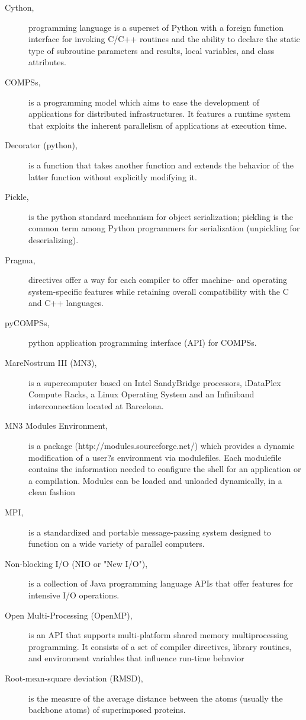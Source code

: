 \begin{description}
\item [Cython,] programming language is a superset of Python with a foreign function interface for invoking C/C++ routines and the ability to declare the static type of subroutine parameters and results, local variables, and class attributes.
\item [COMPSs,] is a programming model which aims to ease the development of applications for distributed infrastructures. It features a runtime system that exploits the inherent parallelism of applications at execution time.
\item [Decorator (python),] is a function that takes another function and extends the behavior of the latter function without explicitly modifying it.
\item [Pickle,] is the python standard mechanism for object serialization; pickling is the common term among Python programmers for serialization (unpickling for deserializing).
\item [Pragma,] directives offer a way for each compiler to offer machine- and operating system-specific features while retaining overall compatibility with the C and C++ languages.
\item[pyCOMPSs,] python application programming interface (API) for COMPSs.
\item  [MareNostrum III (MN3),]  is a supercomputer based on Intel SandyBridge processors, iDataPlex Compute Racks, a Linux Operating System and an Infiniband interconnection located at Barcelona.
\item [MN3 Modules Environment,] is a package (http://modules.sourceforge.net/) which provides a dynamic modification
of a user?s environment via modulefiles. Each modulefile contains the information needed to
configure the shell for an application or a compilation. Modules can be loaded and unloaded dynamically,
in a clean fashion
\item[MPI,] is a standardized and portable message-passing system designed to function on a wide variety of parallel computers.
\item [Non-blocking I/O (NIO or "New I/O"),] is a collection of Java programming language APIs that offer features for intensive I/O operations. 
\item [Open Multi-Processing (OpenMP),] is an API that supports multi-platform shared memory multiprocessing programming. It consists of a set of compiler directives, library routines, and environment variables that influence run-time behavior
\item [Root-mean-square deviation (RMSD),] is the measure of the average distance between the atoms (usually the backbone atoms) of superimposed proteins.

\end{description}
